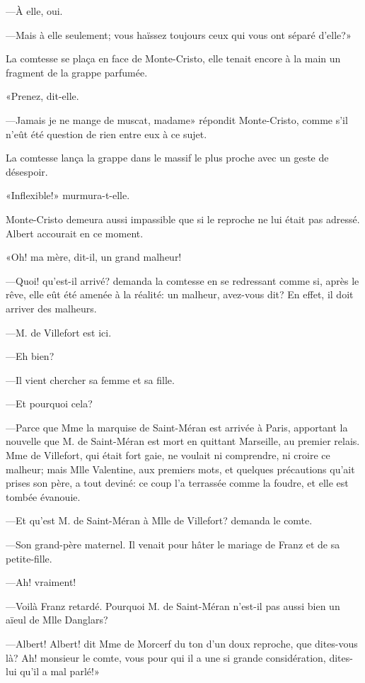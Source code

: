 —À elle, oui. 

—Mais à elle seulement; vous haïssez toujours ceux qui vous ont séparé d'elle?» 

La comtesse se plaça en face de Monte-Cristo, elle tenait encore à la main un fragment de la grappe parfumée. 

«Prenez, dit-elle. 

—Jamais je ne mange de muscat, madame» répondit Monte-Cristo, comme s'il n'eût été question de rien entre eux à ce sujet. 

La comtesse lança la grappe dans le massif le plus proche avec un geste de désespoir. 

«Inflexible!» murmura-t-elle. 

Monte-Cristo demeura aussi impassible que si le reproche ne lui était pas adressé. Albert accourait en ce moment. 

«Oh! ma mère, dit-il, un grand malheur! 

—Quoi! qu'est-il arrivé? demanda la comtesse en se redressant comme si, après le rêve, elle eût été amenée à la réalité: un malheur, avez-vous dit? En effet, il doit arriver des malheurs. 

—M. de Villefort est ici. 

—Eh bien? 

—Il vient chercher sa femme et sa fille. 

—Et pourquoi cela? 

—Parce que Mme la marquise de Saint-Méran est arrivée à Paris, apportant la nouvelle que M. de Saint-Méran est mort en quittant Marseille, au premier relais. Mme de Villefort, qui était fort gaie, ne voulait ni comprendre, ni croire ce malheur; mais Mlle Valentine, aux premiers mots, et quelques précautions qu'ait prises son père, a tout deviné: ce coup l'a terrassée comme la foudre, et elle est tombée évanouie. 

—Et qu'est M. de Saint-Méran à Mlle de Villefort? demanda le comte. 

—Son grand-père maternel. Il venait pour hâter le mariage de Franz et de sa petite-fille. 

—Ah! vraiment! 

—Voilà Franz retardé. Pourquoi M. de Saint-Méran n'est-il pas aussi bien un aïeul de Mlle Danglars? 

—Albert! Albert! dit Mme de Morcerf du ton d'un doux reproche, que dites-vous là? Ah! monsieur le comte, vous pour qui il a une si grande considération, dites-lui qu'il a mal parlé!» 

